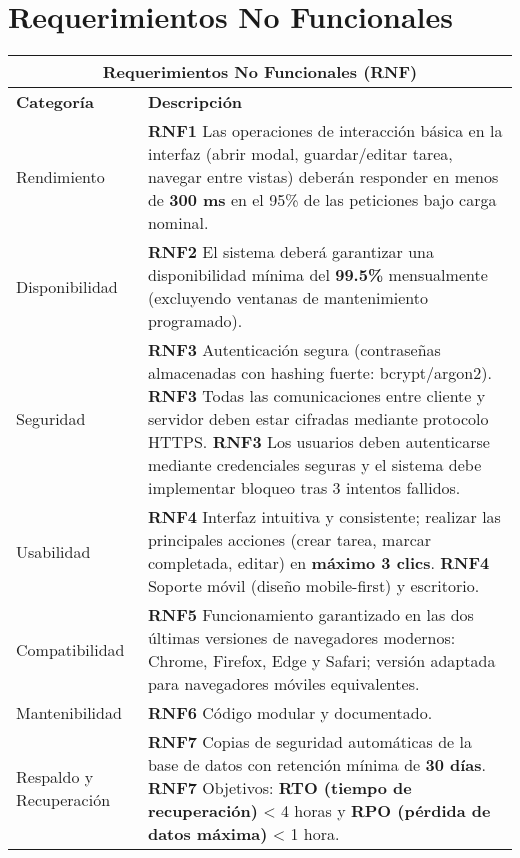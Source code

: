 \documentclass[11pt]{article}
\begin{document}
\section{Requerimientos No Funcionales}
\begin{table}[H]
    \centering
    \begin{tabular}{|p{3cm}|p{12cm}|}
    \hline
    \multicolumn{2}{|c|}{\textbf{Requerimientos No Funcionales (RNF)}} \\
    \hline
    \textbf{Categoría} & \textbf{Descripción} \\
    \hline
    Rendimiento & \textbf{RNF1} Las operaciones de interacción básica en la interfaz (abrir modal, guardar/editar tarea, navegar entre vistas) deberán responder en menos de \textbf{300 ms} en el 95\% de las peticiones bajo carga nominal. \\ 
    \hline
    Disponibilidad & \textbf{RNF2} El sistema deberá garantizar una disponibilidad mínima del \textbf{99.5\%} mensualmente (excluyendo ventanas de mantenimiento programado). \\ 
    \hline
    Seguridad & \textbf{RNF3} Autenticación segura (contraseñas almacenadas con hashing fuerte: bcrypt/argon2). \newline
                \textbf{RNF3} Todas las comunicaciones entre cliente y servidor deben estar cifradas mediante protocolo HTTPS. \newline
                \textbf{RNF3} Los usuarios deben autenticarse mediante credenciales seguras y el sistema debe implementar bloqueo tras 3 intentos fallidos. \\ 
    \hline
    Usabilidad & \textbf{RNF4} Interfaz intuitiva y consistente; realizar las principales acciones (crear tarea, marcar completada, editar) en \textbf{máximo 3 clics}. \newline
                \textbf{RNF4} Soporte móvil (diseño mobile-first) y escritorio. \\ 
    \hline
    Compatibilidad & \textbf{RNF5} Funcionamiento garantizado en las dos últimas versiones de navegadores modernos: Chrome, Firefox, Edge y Safari; versión adaptada para navegadores móviles equivalentes. \\ 
    \hline
    Mantenibilidad & \textbf{RNF6} Código modular y documentado.\\ 
    \hline
    Respaldo y Recuperación & \textbf{RNF7} Copias de seguridad automáticas de la base de datos con retención mínima de \textbf{30 días}. \newline
                             \textbf{RNF7} Objetivos: \textbf{RTO (tiempo de recuperación)} < 4 horas y \textbf{RPO (pérdida de datos máxima)} < 1 hora. \\ 

\end{tabular}
\end{table}
\end{document}
